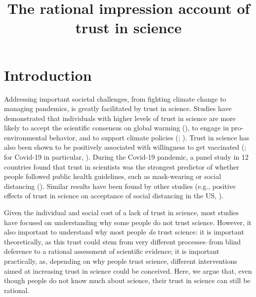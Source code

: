 \documentclass[
  jou,
  floatsintext,
  longtable,
  nolmodern,
  notxfonts,
  notimes,
  colorlinks=true,linkcolor=blue,citecolor=blue,urlcolor=blue]{apa7}
\title{The rational impression account of trust in science}
\begin{document}
\maketitle


\setcounter{secnumdepth}{-\maxdimen} %

\setlength\LTleft{0pt}


\section{Introduction}\label{introduction}

Addressing important societal challenges, from fighting climate change
to managing pandemics, is greatly facilitated by trust in science.
Studies have demonstrated that individuals with higher levels of trust
in science are more likely to accept the scientific consensus on global
warming (), to engage in pro-environmental behavior, and to support climate
policies (;
). Trust in science has also been shown to be positively
associated with willingness to get vaccinated
(; for
Covid-19 in particular,
). During the Covid-19 pandemic, a panel study in 12 countries
found that trust in scientists was the strongest predictor of whether
people followed public health guidelines, such as mask-wearing or social
distancing (). Similar results have been found by other studies (e.g., positive
effects of trust in science on acceptance of social distancing in the
US, ).

Given the individual and social cost of a lack of trust in science, most
studies have focused on understanding why some people do not trust
science. However, it also important to understand why most people
\emph{do} trust science: it is important theoretically, as this trust
could stem from very different processes--from blind deference to a
rational assessment of scientific evidence; it is important practically,
as, depending on why people trust science, different interventions aimed
at increasing trust in science could be conceived. Here, we argue that,
even though people do not know much about science, their trust in
science can still be rational.
\end{document}

